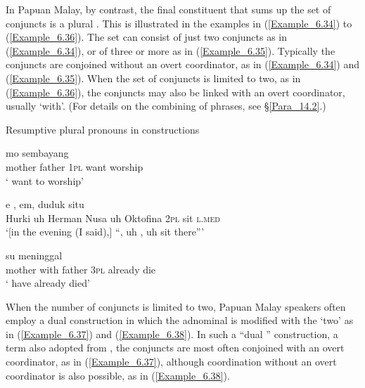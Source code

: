 In Papuan Malay, by contrast, the final constituent that sums up the set of conjuncts is a plural . This is illustrated in the examples in (\ref{Example_6.34}) to (\ref{Example_6.36}). The set can consist of just two conjuncts as in (\ref{Example_6.34}), or of three or more as in (\ref{Example_6.35}). Typically the conjuncts are conjoined without an overt coordinator, as in (\ref{Example_6.34}) and (\ref{Example_6.35}). When the set of conjuncts is limited to two, as in (\ref{Example_6.36}), the conjuncts may also be linked with an overt coordinator, usually   ‘with’. (For details on the combining of  phrases, see §\ref{Para_14.2}.)



\begin{styleExampleTitle}
Resumptive plural pronouns in  constructions
\end{styleExampleTitle}

\ea
\label{Example_6.34}
 {} {} {mo} {sembayang}\\ %
 mother  father  \textsc{1pl}  want  worship\\

\glt
‘ want to worship’ \textstyleExampleSource{[080917-003b-CvEx.0020]}
\z

\ea
\label{Example_6.35}
\gll {\ldots} {} {e} {} {,} {em,} {} {} {duduk} {situ}\\ %
 { }  Hurki  uh  Herman  Nusa  uh  Oktofina  \textsc{2pl}  sit  \textsc{l.med}\\

\glt
‘[in the evening (I said),] ``, uh , uh  sit there''' \textstyleExampleSource{[081115-001a-Cv.0085]}
\z

\ea
\label{Example_6.36}
 {} {} {} {su} {meninggal}\\ %
 mother  with  father  \textsc{3pl}  already  die\\

\glt
‘ have already died’ \textstyleExampleSource{[080919-006-CvNP.0012]}
\z


When the number of conjuncts is limited to two, Papuan Malay speakers often employ a dual construction in which the adnominal  is modified with the   ‘two’ as in (\ref{Example_6.37}) and (\ref{Example_6.38}). In such a “dual ” construction, a term also adopted from \citet[36]{Haspelmath.2007c}, the conjuncts are most often conjoined with an overt coordinator, as in (\ref{Example_6.37}), although coordination without an overt coordinator is also possible, as in (\ref{Example_6.38}).



